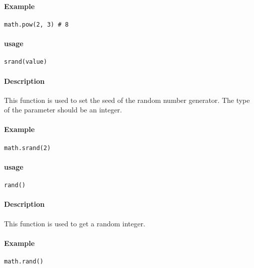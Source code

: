 \paragraph{Example}
\begin{lstlisting}[language=berry, numbers=none]
math.pow(2, 3) # 8
\end{lstlisting}


\paragraph{usage}
\begin{lstlisting}[language=berry, numbers=none]
srand(value)
\end{lstlisting}

\paragraph{Description}
This function is used to set the seed of the random number generator. The type of the parameter should be an integer.

\paragraph{Example}
\begin{lstlisting}[language=berry, numbers=none]
math.srand(2)
\end{lstlisting}


\paragraph{usage}
\begin{lstlisting}[language=berry, numbers=none]
rand()
\end{lstlisting}

\paragraph{Description}
This function is used to get a random integer.

\paragraph{Example}
\begin{lstlisting}[language=berry, numbers=none]
math.rand()
\end{lstlisting}

